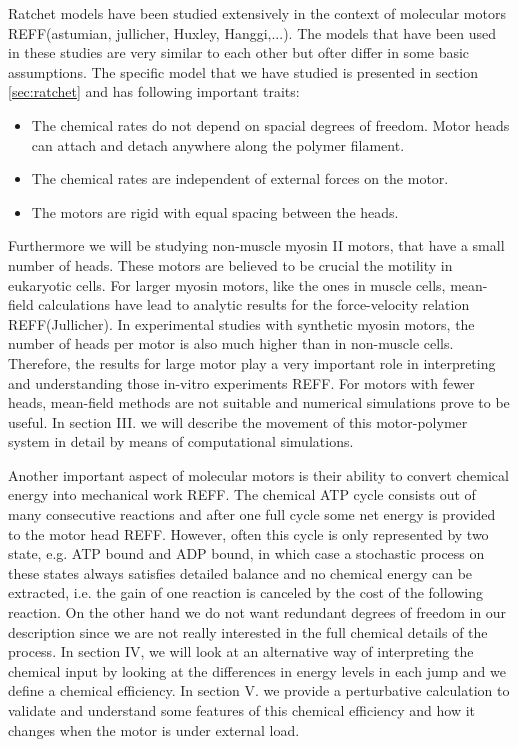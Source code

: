 \documentclass[aps,pre,twocolumn,showpacs,showkeys,a4paper]{revtex4}
\begin{document}
Ratchet models have been studied extensively in the context of molecular motors REFF(astumian, jullicher, Huxley, Hanggi,...). %
The models that have been used in these studies are very similar to each other but ofter differ in some basic assumptions.
The specific model that we have studied is presented in section \ref{sec:ratchet} and has following important traits:
\begin{itemize}
\item The chemical rates do not depend on spacial degrees of freedom. 
Motor heads can attach and detach anywhere along the polymer filament.
\item The chemical rates are independent of external forces on the motor.
\item The motors are rigid with equal spacing between the heads.
\end{itemize} 
Furthermore we will be studying non-muscle myosin II motors, that have a small number of heads. 
These motors are believed to be crucial the motility in eukaryotic cells.
For larger myosin motors, like the ones in muscle cells, mean-field calculations have lead to analytic results for the force-velocity relation REFF(Jullicher). %
In experimental studies with synthetic myosin motors, the number of heads per motor is also much higher than in non-muscle cells. 
Therefore, the results for large motor play a very important role in interpreting and understanding those in-vitro experiments REFF. %
For motors with fewer heads, mean-field methods are not suitable and numerical simulations prove to be useful.
In section III. we will describe the movement of this motor-polymer system in detail by means of computational simulations. %


Another important aspect of molecular motors is their ability to convert chemical energy into mechanical work REFF. %
The chemical ATP cycle consists out of many consecutive reactions and after one full cycle some net energy is provided to the motor head REFF. %
However, often this cycle is only represented by two state, e.g. ATP bound and ADP bound, 
in which case a stochastic process on these states always satisfies detailed balance and no chemical energy can be extracted, 
i.e. the gain of one reaction is canceled by the cost of the following reaction.
On the other hand we do not want redundant degrees of freedom in our description since we are not really interested in the full chemical details of the process.
In section IV, we will look at an alternative way of interpreting the chemical input by looking at the differences in energy levels in each jump and we define a chemical efficiency. %
In section V. we provide a perturbative calculation to validate and understand some features of this chemical efficiency and how it changes when the motor is under external load. %
\end{document}
